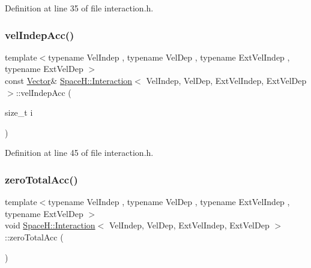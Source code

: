 Definition at line 35 of file interaction.\+h.

\mbox{\label{class_space_h_1_1_interaction_af2360c5ed9f347420c6ecbe77fc1357d}} 
\subsubsection{\texorpdfstring{vel\+Indep\+Acc()}{velIndepAcc()}\hspace{0.1cm}{\footnotesize\ttfamily [2/2]}}
{\footnotesize\ttfamily template$<$typename Vel\+Indep , typename Vel\+Dep , typename Ext\+Vel\+Indep , typename Ext\+Vel\+Dep $>$ \\
const \mbox{\hyperlink{class_space_h_1_1_interaction_ad6d656d30b9272a5f690b0412a4a9a86}{Vector}}\& \mbox{\hyperlink{class_space_h_1_1_interaction}{Space\+H\+::\+Interaction}}$<$ Vel\+Indep, Vel\+Dep, Ext\+Vel\+Indep, Ext\+Vel\+Dep $>$\+::vel\+Indep\+Acc (\begin{DoxyParamCaption}\item[{size\+\_\+t}]{i }\end{DoxyParamCaption})\hspace{0.3cm}{\ttfamily [inline]}}



Definition at line 45 of file interaction.\+h.

\mbox{\label{class_space_h_1_1_interaction_a000918130269445ac83b2df6243add07}} 
\subsubsection{\texorpdfstring{zero\+Total\+Acc()}{zeroTotalAcc()}}
{\footnotesize\ttfamily template$<$typename Vel\+Indep , typename Vel\+Dep , typename Ext\+Vel\+Indep , typename Ext\+Vel\+Dep $>$ \\
void \mbox{\hyperlink{class_space_h_1_1_interaction}{Space\+H\+::\+Interaction}}$<$ Vel\+Indep, Vel\+Dep, Ext\+Vel\+Indep, Ext\+Vel\+Dep $>$\+::zero\+Total\+Acc (\begin{DoxyParamCaption}{ }\end{DoxyParamCaption})\hspace{0.3cm}{\ttfamily [inline]}}



